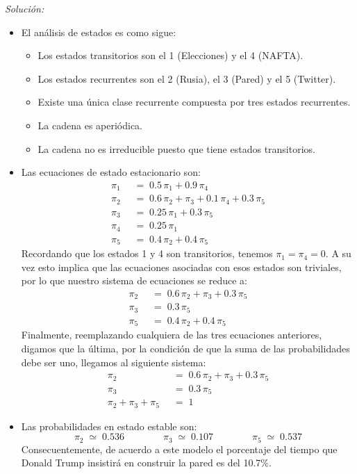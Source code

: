 \documentclass[ a4paper, twoside, 11pt]{article}
\begin{document}
\begin{problem}
\emph{Soluci\'on:}
\begin{itemize}
\item El an\'alisis de estados es como sigue: 
\begin{itemize}
\item Los estados transitorios son el 1 (Elecciones) y el 4 (NAFTA). 
\item Los estados recurrentes son el 2 (Rusia), el 3 (Pared) y el 5 (Twitter). 
\item Existe una \'unica clase recurrente compuesta por tres estados recurrentes. 
\item La cadena es aperi\'odica. 
\item La cadena no es irreducible puesto que tiene estados transitorios. 
\end{itemize}
\item Las ecuaciones de estado estacionario son: 
\begin{align*}
\pi_1 \; & \; = \; 
0.5 \, \pi_1 + 0.9 \, \pi_4 \\
\pi_2 \; & \; = \; 
0.6 \, \pi_2 + \pi_3 + 0.1 \, \pi_4 + 0.3 \, \pi_5 \\
\pi_3 \; & \; = \; 0.25 \, \pi_1 + 0.3 \, \pi_5 \\
\pi_4 \; & \; = \; 0.25 \, \pi_1 \\
\pi_5 \; & \; = \; 0.4 \, \pi_2 + 0.4 \, \pi_5
\end{align*}
Recordando que los estados 1 y 4 son transitorios, tenemos $\pi_1 = \pi_4 = 0$. A su vez esto implica que las ecuaciones asociadas con esos estados son triviales, por lo que nuestro sistema de ecuaciones se reduce a: 
\begin{align*}
\pi_2 \; & \; = \; 
0.6 \, \pi_2 + \pi_3 + 0.3 \, \pi_5 \\
\pi_3 \; & \; = \; 0.3 \, \pi_5 \\
\pi_5 \; & \; = \; 0.4 \, \pi_2 + 0.4 \, \pi_5
\end{align*}
Finalmente, reemplazando cualquiera de las tres ecuaciones anteriores, \eg digamos que la \'ultima, por la condici\'on de que la suma de las probabilidades debe ser uno, \linebreak llegamos al siguiente sistema: 
\begin{align*}
\pi_2 \; & \; = \; 
0.6 \, \pi_2 + \pi_3 + 0.3 \, \pi_5 \\
\pi_3 \; & \; = \; 0.3 \, \pi_5 \\
\pi_2 + \pi_3 + \pi_5 \; & \; = \; 1
\end{align*}
\item Las probabilidades en estado estable son: 
\[
\pi_2 \; \simeq \; 0.536 \qquad \qquad
\pi_3 \; \simeq \; 0.107 \qquad \qquad
\pi_5 \; \simeq \; 0.537
\]
Consecuentemente, de acuerdo a este modelo el porcentaje del tiempo que Donald Trump insistir\'a en construir la pared es del 10.7\%. 


\end{itemize}

\end{problem}
\vspace{\baselineskip}
\end{document}
